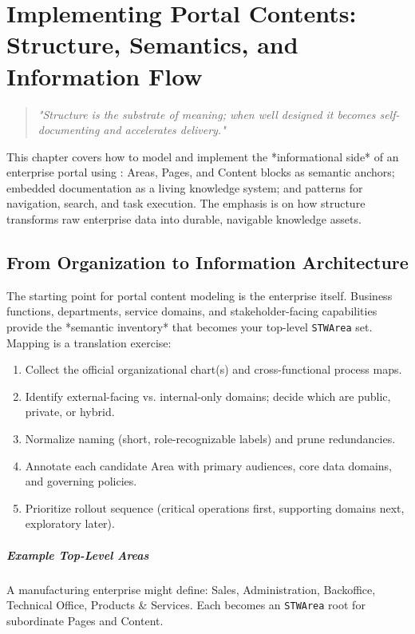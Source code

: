 \chapter{Implementing Portal Contents: Structure, Semantics, and Information Flow}
\label{chap:portal-contents}

\begin{quote}
\textit{"Structure is the substrate of meaning; when well designed it becomes self-documenting and accelerates delivery."}
\end{quote}

This chapter covers how to model and implement the *informational side* of an enterprise portal using \wbdl{}: Areas, Pages, and Content blocks as semantic anchors; embedded documentation as a living knowledge system; and patterns for navigation, search, and task execution. The emphasis is on how structure transforms raw enterprise data into durable, navigable knowledge assets.

\section{From Organization to Information Architecture}
\label{sec:contents-org-to-ia}
The starting point for portal content modeling is the enterprise itself. Business functions, departments, service domains, and stakeholder-facing capabilities provide the *semantic inventory* that becomes your top-level \texttt{STWArea} set. Mapping is a translation exercise:
\begin{enumerate}
	\item Collect the official organizational chart(s) and cross-functional process maps.
	\item Identify external-facing vs. internal-only domains; decide which are public, private, or hybrid.
	\item Normalize naming (short, role-recognizable labels) and prune redundancies.
	\item Annotate each candidate Area with primary audiences, core data domains, and governing policies.
	\item Prioritize rollout sequence (critical operations first, supporting domains next, exploratory later).
\end{enumerate}
\paragraph{Example Top-Level Areas} A manufacturing enterprise might define: Sales, Administration, Backoffice, Technical Office, Products \& Services. Each becomes an \texttt{STWArea} root for subordinate Pages and Content.

